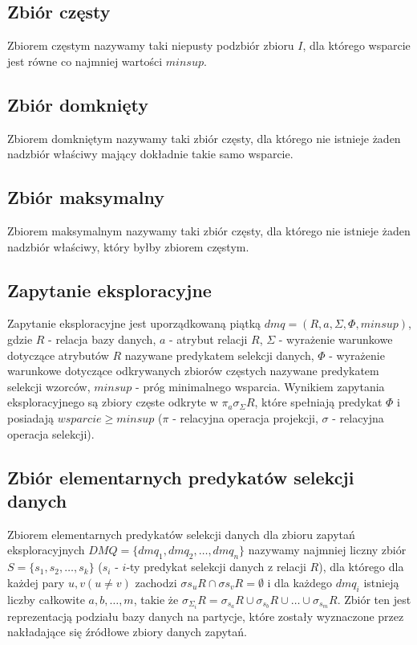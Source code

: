 \subsection{Zbiór częsty}
\label{c226}
Zbiorem częstym nazywamy taki niepusty podzbiór zbioru \(I\), dla którego wsparcie jest równe co najmniej wartości \(minsup\).

\subsection{Zbiór domknięty}
\label{c227}
Zbiorem domkniętym nazywamy taki zbiór częsty, dla którego nie istnieje żaden nadzbiór właściwy mający dokładnie takie samo wsparcie.

\subsection{Zbiór maksymalny}
\label{c228}
Zbiorem maksymalnym nazywamy taki zbiór częsty, dla którego nie istnieje żaden nadzbiór właściwy, który byłby zbiorem częstym.

\subsection{Zapytanie eksploracyjne}
\label{c229}
Zapytanie eksploracyjne jest uporządkowaną piątką \(dmq = (R, a, \Sigma, \Phi, minsup) \), gdzie \(R\) - relacja bazy danych, \(a\) - atrybut relacji \(R\), \(\Sigma\) - wyrażenie warunkowe dotyczące atrybutów \(R\) nazywane predykatem selekcji danych, \(\Phi\) - wyrażenie warunkowe dotyczące odkrywanych zbiorów częstych nazywane predykatem selekcji wzorców, \(minsup\) - próg minimalnego wsparcia. Wynikiem zapytania eksploracyjnego są zbiory częste odkryte w \(\pi _a \sigma _\Sigma R \), które spełniają predykat \(\Phi\) i posiadają \(wsparcie \geq minsup\) (\(\pi\) - relacyjna operacja projekcji, \(\sigma\) - relacyjna operacja selekcji).

\subsection{Zbiór elementarnych predykatów selekcji danych}
\label{c2210}
Zbiorem elementarnych predykatów selekcji danych dla zbioru zapytań eksploracyjnych \(DMQ = \{dmq_1, dmq_2, \dots, dmq_n\}\) nazywamy najmniej liczny zbiór \(S = \{s_1, s_2, \dots, s_k\}\) (\(s_i\) - \(i\)-ty predykat selekcji danych z relacji \(R\)), dla którego dla każdej pary \(u, v (u \neq v)\) zachodzi \(\sigma{s_u}R \cap \sigma{s_v}R = \emptyset\)  i dla każdego \(dmq_i\) istnieją liczby całkowite \(a, b, \dots, m\), takie że \(\sigma_{\Sigma_i}R = \sigma_{s_a}R \cup \sigma_{s_b}R \cup \dots \cup \sigma_{s_m}R\). Zbiór ten jest reprezentacją podziału bazy danych na partycje, które zostały wyznaczone przez nakładające się źródłowe zbiory danych zapytań.